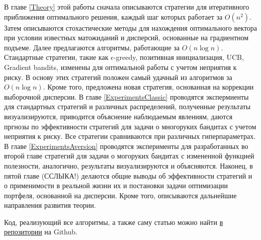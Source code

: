 В главе \ref{Theory} этой работы сначала описываются стратегии для итеративного приближения оптимального решения, каждый шаг которых работает за $O(n^2)$. Затем описываются стохастические методы для нахождения оптимального вектора при условии известных матожиданий и дисперсий, основанные на градиентном подъеме. Далее предлагаются алгоритмы, работающие за $O(n \log n)$. Стандартные стратегии, такие как $\epsilon$-greedy, позитивная инициализация, UCB, Gradient bandits, изменены для оптимальной работы с учетом неприятия к риску. В основу этих стратегий положен самый удачный из алгоритмов за $O(n \log n)$. Кроме того, предложена новая стратегия, основанная на коррекции выборочной дисперсии. В главе \ref{ExperimentsClassic} проводятся экспермиенты для стандартных стратегий и различных распределений, полученные результаты визуализируются, приводится объяснение наблюдаемым явлениям, даются пргнозы по эффективности стратегий для задачи о многоруких бандитах с учетом неприятия к риску. Все стратегии сравниваются при различных гиперпараметрах. В главе \ref{ExperimentsAversion} проводятся эксперименты для разработанных во второй главе стратегий для задачи о могоруких бандитах с измененной функцией полезности, аналогично, результаты визуализируются и объясняются. Наконец, в пятой главе (ССЛЫКА!) делаются общие выводы об эффективности стратегий и о применимости в реальной жизни их и постановки задачи оптимизации портфеля, основанной на дисперсии. Кроме того, описываются дальнейшие направления развития теории.

Код, реализующий все алгоритмы, а также саму статью можно найти \href{https://github.com/davynchi/diploma/blob/main}{в репозитории} на Github.











